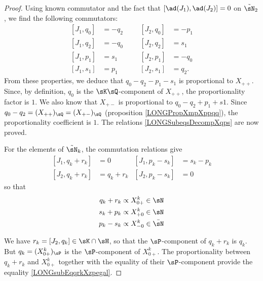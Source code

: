 \begin{proof}


	Using known commutator and the fact that $[\ad(J_1),\ad(J_2)]=0$ on $\tilde\sN_2$, we find the following commutators:
	\begin{subequations}			
		\begin{align}
			[J_1,q_0]&=-q_2	&&	&[J_2,q_0]&=-p_1			\label{LONGsubEqJunqzJdeuxqzmoinspun}\\
			[J_1,q_2]&=-q_0	&&	&[J_2,q_2]&=s_1\label{LONGsubEqJunqzJdeuxqzmoinspdeux}\\
			[J_1,p_1]&=s_1	&&	&[J_2,p_1]&=-q_0\\
			[J_1,s_1]&=p_1	&&	&[J_2,s_1]&=q_2.
		\end{align}
	\end{subequations}
	From these properties, we deduce that $q_0-q_2-p_1-s_1$ is proportional to $X_{++}$. Since, by definition, $q_0$ is the $\sK\sQ$-component of $X_{++}$, the proportionality factor is $1$. We also know that  $X_{+-}$ is proportional to $q_0-q_2+p_1+s1$. Since $q_0-q_2=(X_{++})_{\sQ}=(X_{+-})_{\sQ}$ (proposition \ref{LONGPropXmpXppqq}), the proportionality coefficient is $1$. The relations \eqref{LONGSubeqsDecompXqps} are now proved.

	For the elements of $\tilde\sN_k$, the commutation relations give
	\begin{subequations}
		\begin{align}
			[J_1,q_k+r_k]&=0		&[J_1,p_k-s_k]&=s_k-p_k\\
			[J_2,q_k+r_k]&=q_k+r_k		&[J_2,p_k-s_k]&=0
		\end{align}
	\end{subequations}
	so that
	\begin{equation}
		\begin{aligned}[]
			q_k+r_k&\propto X_{0+}^k\in\sN\\
			s_k+p_k&\propto X^k_{+0}\in\sN\\
			p_k-s_k&\propto X^k_{-0}\in\bar\sN
		\end{aligned}
	\end{equation}

	We have $r_k=[J_2,q_k]\in\sK\cap\sH$, so that the $\sP$-component of $q_k+r_k$ is $q_k$. But $q_k=(X_{0+}^k)_{\sP}$ is the $\sP$-component of $X_{0+}^k$. The proportionality between $q_k+r_k$ and $X_{0+}^k$ together with the equality of their $\sP$-component provide the equality \eqref{LONGsubEqqrkXzpegal}.


\end{proof}
